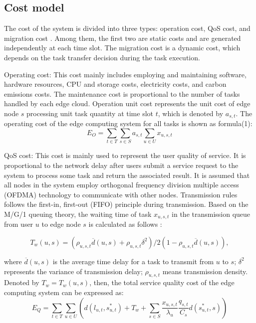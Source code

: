 \documentclass[journal,article,submit,pdftex,moreauthors]{Definitions/mdpi}
\begin{document}
\subsection{Cost model}
The cost of the system is divided into three types: operation cost, QoS cost, and migration cost \cite{WANG}. Among them, the first two are static costs and are generated independently at each time slot. The migration cost is a dynamic cost, which depends on the task transfer decision during the task execution.


Operating cost: This cost mainly includes employing and  maintaining software, hardware resources,  CPU and storage costs, electricity costs, and carbon emissions costs. The maintenance cost is proportional to the number of tasks handled by each edge cloud. Operation unit cost represents the unit cost of edge node $s$ processing unit task quantity at time slot $t$, which is denoted by $a_{s,t}$. The operating cost of the edge computing system for all tasks is shown as formula(1):
\begin{equation}
E_O=\sum_{t\in T}\sum_{s\in S}a_{s,t}\sum_{u\in U}x_{u,s,t}        
\end{equation}

QoS cost: This cost is mainly used to represent the user quality of service. It is proportional to the network delay after users submit a service request to the system to process some task and return the associated result. It is assumed that all nodes in the system employ orthogonal frequency division multiple access (OFDMA) technology to communicate with other nodes. Transmission rules follows the first-in, first-out (FIFO) principle during transmission. Based on the M/G/1 queuing theory, the waiting time of task $x_{u,s,t}$ in the transmission queue from user $u$ to edge node $s$ is  calculated as follows \cite{WangX2020,Thomas2020}:

\begin{equation*}
T_w(u,s)=(\rho_{u,s,t}\overline{d}(u,s)+\rho_{u,s,t}\delta^2)/2(1-\rho_{u,s,t}\overline{d}(u,s)),      
\end{equation*}

 where $\overline{d}(u,s)$ is the average time delay for a task to transmit from $u$ to $s$; $\delta^2$ represents the variance of transmission delay; $\rho_{u,s,t}$ means transmission density. Denoted by $T_w=T_w(u,s)$, then, the total service quality cost of the edge computing system can be expressed as:
\begin{equation}
E_Q=\sum_{t\in T}\sum_{u\in U}(d(l_{u,t},s_{u,t}^{*})+T_w+\sum_{s \in S}\frac{x_{u,s,t}}{\lambda_u}\frac{q_{s,t}}{C_s}d(s_{u,t}^{*},s))     
\end{equation}
\end{document}
